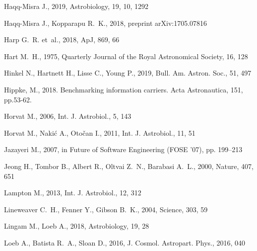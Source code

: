\documentclass[crop]{CSLB}
\begin{document}
\begin{thebibliography}{95}
Haqq-Misra J., 2019, Astrobiology, 19, 10, 1292

Haqq-Misra J., Kopparapu R.~K., 2018, preprint arXiv:1705.07816

Harp G.~R. {et~al.}, 2018, ApJ, 869, 66

Hart M.~H., 1975, Quarterly Journal of the Royal Astronomical Society, 16, 128

Hinkel N., Hartnett H., Lisse C., Young P., 2019, Bull. Am. Astron. Soc., 51,
  497

Hippke, M., 2018. Benchmarking information carriers. Acta Astronautica, 151, pp.53-62.

Horvat M., 2006, Int. J. Astrobiol., 5, 143

Horvat M., Naki{\'{c}} A., Oto{\v{c}}an I., 2011, Int. J. Astrobiol., 11, 51

{Jazayeri} M., 2007, in Future of Software Engineering (FOSE '07), pp. 199--213

Jeong H., Tombor B., Albert R., Oltvai Z.~N., Barabasi A.~L., 2000, Nature,
  407, 651

Lampton M., 2013, Int. J. Astrobiol., 12, 312

Lineweaver C.~H., Fenner Y., Gibson B.~K., 2004, Science, 303, 59

Lingam M., Loeb A., 2018, Astrobiology, 19, 28

Loeb A., Batista R.~A., Sloan D., 2016, J. Cosmol. Astropart. Phys., 2016, 040


\end{thebibliography}
\end{document}
